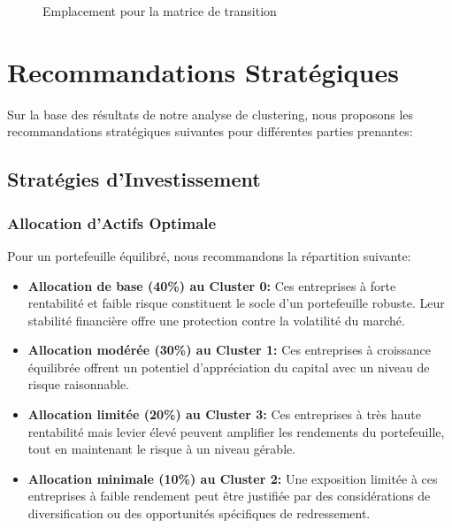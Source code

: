 \begin{figure}[H]
    \centering
    \caption{Emplacement pour la matrice de transition}
    \label{fig:transition}
\end{figure}

\newpage
\section{Recommandations Stratégiques}
Sur la base des résultats de notre analyse de clustering, nous proposons les recommandations stratégiques suivantes pour différentes parties prenantes:

\subsection{Stratégies d'Investissement}
\subsubsection{Allocation d'Actifs Optimale}
Pour un portefeuille équilibré, nous recommandons la répartition suivante:

\begin{itemize}
    \item \textbf{Allocation de base (40\%) au Cluster 0:} Ces entreprises à forte rentabilité et faible risque constituent le socle d'un portefeuille robuste. Leur stabilité financière offre une protection contre la volatilité du marché.
    
    \item \textbf{Allocation modérée (30\%) au Cluster 1:} Ces entreprises à croissance équilibrée offrent un potentiel d'appréciation du capital avec un niveau de risque raisonnable.
    
    \item \textbf{Allocation limitée (20\%) au Cluster 3:} Ces entreprises à très haute rentabilité mais levier élevé peuvent amplifier les rendements du portefeuille, tout en maintenant le risque à un niveau gérable.
    
    \item \textbf{Allocation minimale (10\%) au Cluster 2:} Une exposition limitée à ces entreprises à faible rendement peut être justifiée par des considérations de diversification ou des opportunités spécifiques de redressement.
\end{itemize}

